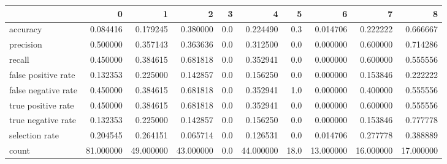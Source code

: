 \begin{tabular}{lrrrrrrrrr}
\toprule
{} &          0 &          1 &          2 &    3 &          4 &     5 &          6 &          7 &          8 \\
\midrule
accuracy            &   0.084416 &   0.179245 &   0.380000 &  0.0 &   0.224490 &   0.3 &   0.014706 &   0.222222 &   0.666667 \\
precision           &   0.500000 &   0.357143 &   0.363636 &  0.0 &   0.312500 &   0.0 &   0.000000 &   0.600000 &   0.714286 \\
recall              &   0.450000 &   0.384615 &   0.681818 &  0.0 &   0.352941 &   0.0 &   0.000000 &   0.600000 &   0.555556 \\
false positive rate &   0.132353 &   0.225000 &   0.142857 &  0.0 &   0.156250 &   0.0 &   0.000000 &   0.153846 &   0.222222 \\
false negative rate &   0.450000 &   0.384615 &   0.681818 &  0.0 &   0.352941 &   1.0 &   0.000000 &   0.400000 &   0.555556 \\
true positive rate  &   0.450000 &   0.384615 &   0.681818 &  0.0 &   0.352941 &   0.0 &   0.000000 &   0.600000 &   0.555556 \\
true negative rate  &   0.132353 &   0.225000 &   0.142857 &  0.0 &   0.156250 &   0.0 &   0.000000 &   0.153846 &   0.777778 \\
selection rate      &   0.204545 &   0.264151 &   0.065714 &  0.0 &   0.126531 &   0.0 &   0.014706 &   0.277778 &   0.388889 \\
count               &  81.000000 &  49.000000 &  43.000000 &  0.0 &  44.000000 &  18.0 &  13.000000 &  16.000000 &  17.000000 \\
\bottomrule
\end{tabular}
